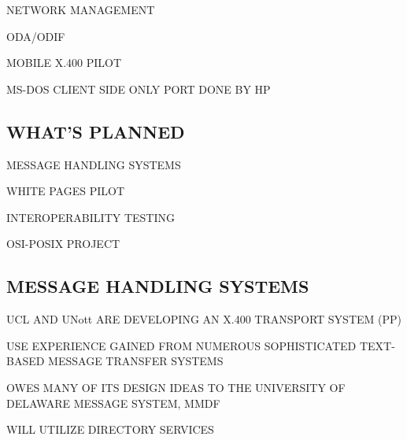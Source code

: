 \begin{bwslide}

\begin{nrtc}
\item	NETWORK MANAGEMENT

\item	ODA/ODIF

\item	MOBILE X.400 PILOT
    \begin{nrtc}
    \item	MS-DOS CLIENT SIDE ONLY PORT DONE BY HP
    \end{nrtc}
\end{nrtc}
\end{bwslide}


\begin{bwslide}
\part	{WHAT'S PLANNED}\bf

\begin{nrtc}
\item	MESSAGE HANDLING SYSTEMS

\item	WHITE PAGES PILOT

\item	INTEROPERABILITY TESTING

\item	OSI-POSIX PROJECT
\end{nrtc}
\end{bwslide}


\begin{bwslide}
\part*	{MESSAGE HANDLING SYSTEMS}

\begin{nrtc}
\item	UCL AND UNott ARE DEVELOPING AN X.400 TRANSPORT SYSTEM (PP)

\item	USE EXPERIENCE GAINED FROM NUMEROUS SOPHISTICATED TEXT-BASED MESSAGE
	TRANSFER SYSTEMS

\item	OWES MANY OF ITS DESIGN IDEAS TO THE UNIVERSITY OF DELAWARE MESSAGE
	SYSTEM, MMDF

\item	WILL UTILIZE DIRECTORY SERVICES
\end{nrtc}
\end{bwslide}


